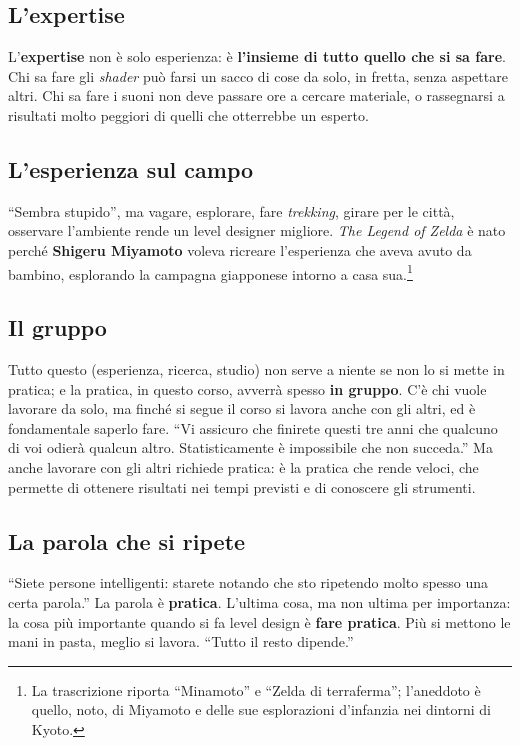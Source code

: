 \subsection{L'expertise}

L'\textbf{expertise} non è solo esperienza: è \textbf{l'insieme di tutto
quello che si sa fare}. Chi sa fare gli \emph{shader} può farsi un sacco di
cose da solo, in fretta, senza aspettare altri. Chi sa fare i suoni non deve
passare ore a cercare materiale, o rassegnarsi a risultati molto peggiori di
quelli che otterrebbe un esperto.

\subsection{L'esperienza sul campo}

``Sembra stupido'', ma vagare, esplorare, fare \emph{trekking}, girare per le
città, osservare l'ambiente rende un level designer migliore. \emph{The Legend
of Zelda} è nato perché \textbf{Shigeru Miyamoto} voleva ricreare
l'esperienza che aveva avuto da bambino, esplorando la campagna giapponese
intorno a casa sua.\footnote{La trascrizione riporta ``Minamoto'' e
``Zelda di terraferma''; l'aneddoto è quello, noto, di Miyamoto e delle sue
esplorazioni d'infanzia nei dintorni di Kyoto.}

\subsection{Il gruppo}

Tutto questo (esperienza, ricerca, studio) non serve a niente se non lo si
mette in pratica; e la pratica, in questo corso, avverrà spesso \textbf{in
gruppo}. C'è chi vuole lavorare da solo, ma finché si segue il corso si lavora
anche con gli altri, ed è fondamentale saperlo fare. ``Vi assicuro che
finirete questi tre anni che qualcuno di voi odierà qualcun altro.
Statisticamente è impossibile che non succeda.'' Ma anche lavorare con gli
altri richiede pratica: è la pratica che rende veloci, che permette di
ottenere risultati nei tempi previsti e di conoscere gli strumenti.

\subsection{La parola che si ripete}

``Siete persone intelligenti: starete notando che sto ripetendo molto spesso
una certa parola.'' La parola è \textbf{pratica}. L'ultima cosa, ma non ultima
per importanza: la cosa più importante quando si fa level design è
\textbf{fare pratica}. Più si mettono le mani in pasta, meglio si lavora.
``Tutto il resto dipende.''

